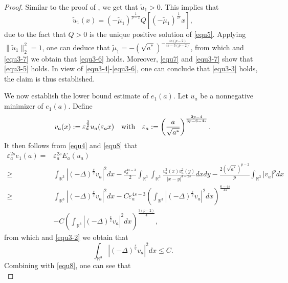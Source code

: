 \documentclass[reqno, 11pt]{amsart} %
\numberwithin{equation}{section}
\begin{document}
\begin{proof}
		Similar to the proof of \cite[Proposition 4.1]{T}, we get that $\tilde{u}_{1}>0$. This implies that
		\begin{equation}\label{equ3-7}
			\tilde{u}_{1}(x)=(-\tilde{\mu}_{1})^{\frac{1}{p-2}}Q\left[(-\tilde{\mu}_{1})^{\frac{1}{2s}}x\right],
		\end{equation}
		due to the fact that $Q>0$ is the unique positive solution of \eqref{equ5}. Applying $\|\tilde{u}_{1}\|_{2}^{2}=1$, one can deduce that $\tilde{\mu}_{1}=-(\sqrt{a^{\ast}})^{-\frac{4s(p-2)}{4s-3(p-2)}}$, from which and \eqref{equ3-7} we obtain that \eqref{equ3-6} holds. Moreover, \eqref{equ7} and \eqref{equ3-7} show that \eqref{equ3-5} holds. In view of \eqref{equ3-4}-\eqref{equ3-6}, one can conclude that \eqref{equ3-3} holds, the claim is thus established.
		
		We now establish the lower bound estimate of $e_{1}(a)$. Let $u_{a}$ be a nonnegative minimizer of $e_{1}(a)$. Define
		\begin{equation}\label{equ3-8}
			v_{a}(x):=\varepsilon_{a}^{\frac{3}{2}}u_{a}(\varepsilon_{a}x)\quad \hbox{with}\quad \varepsilon_{a}:=\left(\frac{a}{\sqrt{a^{\ast}}}\right)^{\frac{2p-4}{3p-6-4s}}.
		\end{equation}
		It then follows from \eqref{equ4} and \eqref{equ8} that
		\begin{equation}\label{equ3-9}
			\begin{split}
				\varepsilon_{a}^{2s}e_{1}(a)=&\varepsilon_{a}^{2s} E_{a}(u_{a})\\
				\geq&\int_{\mathbb{R}^{3}}|(-\Delta)^{\frac{s}{2}} v_{a}|^{2}dx-\frac{\varepsilon_{a}^{4s-3}}{2}\int_{\mathbb{R}^{3}}\int_{\mathbb{R}^{3}}\frac{v_{a}^{2}(x)v_{a}^{2}(y)}{|x-y|^{3-2s}}dxdy-\frac{2(\sqrt{a^{\ast}})^{p-2}}{p}\int_{\mathbb{R}^{3}}|v_{a}|^{p}dx\\
				\geq&\int_{\mathbb{R}^{3}}|(-\Delta)^{\frac{s}{2}} v_{a}|^{2}dx-C\varepsilon_{a}^{4s-3}\left( \int_{\mathbb{R}^{3}}|(-\Delta)^{\frac{s}{2}} v_{a}|^{2}dx\right)^{\frac{6-4s}{4s}}\\
				&-C\left( \int_{\mathbb{R}^{3}}|(-\Delta)^{\frac{s}{2}} v_{a}|^{2}dx\right)^{\frac{3(p-2)}{4}},
			\end{split}
		\end{equation}
		from which and \eqref{equ3-2} we obtain that
		\begin{equation}\label{equ3-10}
			\int_{\mathbb{R}^{3}}|(-\Delta)^{\frac{s}{2}} v_{a}|^{2}dx\leq C.
		\end{equation}
		Combining with \eqref{equ8}, one can see that
		\begin{equation}\label{equ3-11}

\end{equation}
\end{proof}
\end{document}
